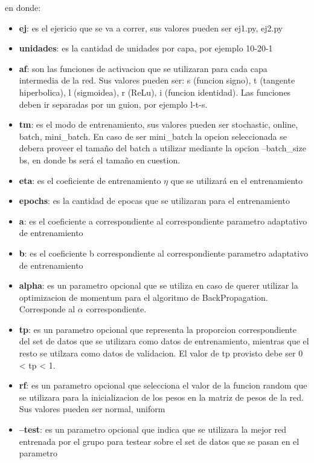 en donde:
\begin{itemize}
  \item \textbf{ej}: es el ejericio que se va a correr, sus valores pueden ser {ej1.py, ej2.py}
  \item \textbf{unidades}: es la cantidad de unidades por capa, por ejemplo 10-20-1
  \item \textbf{af}: son las funciones de activacion que se utilizaran para cada capa intermedia de la red. Sus valores pueden ser: s (funcion signo), t (tangente hiperbolica),
                    l (sigmoidea), r (ReLu), i (funcion identidad). Las funciones deben ir separadas por un guion, por ejemplo l-t-s.
  \item \textbf{tm}: es el modo de entrenamiento, sus valores pueden ser {stochastic, online, batch, mini\_batch}. En caso de ser mini\_batch la opcion seleccionada se debera
            proveer el tamaño del batch a utilizar mediante la opcion --batch\_size bs, en donde bs será el tamaño en cuestion.
  \item \textbf{eta}: es el coeficiente de entrenamiento $\eta$ que se utilizará en el entrenamiento
  \item \textbf{epochs}: es la cantidad de epocas que se utilizaran para el entrenamiento
  \item \textbf{a}: es el coeficiente a correspondiente al correspondiente parametro adaptativo de entrenamiento
  \item \textbf{b}: es el coeficiente b correspondiente al correspondiente parametro adaptativo de entrenamiento
  \item \textbf{alpha}: es un parametro opcional que se utiliza en caso de querer utilizar la optimizacion de momentum para el algoritmo de BackPropagation. Corresponde al $\alpha$
                correspondiente.
  \item \textbf{tp}: es un parametro opcional que representa la proporcion correspondiente del set de datos que se utilizara como datos de entrenamiento,
            mientras que el resto se utilzara como datos de validacion. El valor de tp provisto debe ser 0 < tp < 1.
  \item \textbf{rf}: es un parametro opcional que selecciona el valor de la funcion random que se utilizara para la inicializacion de los pesos en la matriz de pesos de la red.
            Sus valores pueden ser {normal, uniform}
  \item \textbf{--test}: es un parametro opcional que indica que se utilizara la mejor red entrenada por el grupo para testear sobre el set de datos que se pasan en el parametro

\end{itemize}
